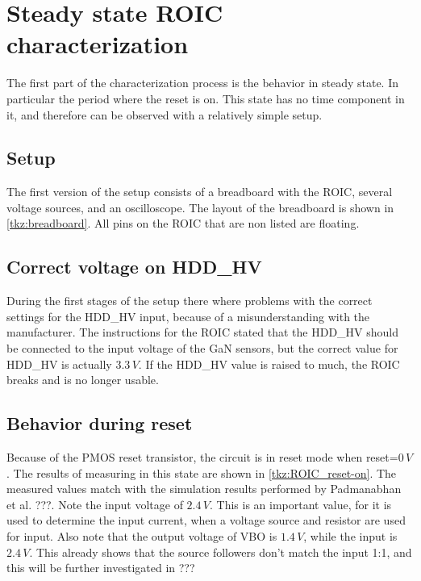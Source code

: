 \section{Steady state ROIC characterization}\label{sec:steady_state_ROIC_characerization}
The first part of the characterization process is the behavior in steady state. In particular the period where the reset is on. This state has no time component in it, and therefore can be observed with a relatively simple setup.

\subsection{Setup}\label{ssec:steady_state_setup}
The first version of the setup consists of a breadboard with the ROIC, several voltage sources, and an oscilloscope. The layout of the breadboard is shown in \cref{tkz:breadboard}. All pins on the ROIC that are non listed are floating.




\subsection{Correct voltage on HDD\_HV}
During the first stages of the setup there where problems with the correct settings for the HDD\_HV input, because of a misunderstanding with the manufacturer. The instructions for the ROIC stated that the HDD\_HV should be connected to the input voltage of the GaN sensors, but the correct value for HDD\_HV is actually $3.3\,V$. If the HDD\_HV value is raised to much, the ROIC breaks and is no longer usable.


\subsection{Behavior during reset}

Because of the PMOS reset transistor, the circuit is in reset mode when reset=$0\,V$. The results of measuring in this state are shown in \cref{tkz:ROIC_reset-on}. The measured values match with the simulation results performed by Padmanabhan et al. ???. Note the input voltage of $2.4\,V$. This is an important value, for it is used to determine the input current, when a voltage source and resistor are used for input. Also note that the output voltage of VBO is $1.4\,V$, while the input is $2.4\,V$. This already shows that the source followers don't match the input 1:1, and this will be further investigated in ???

